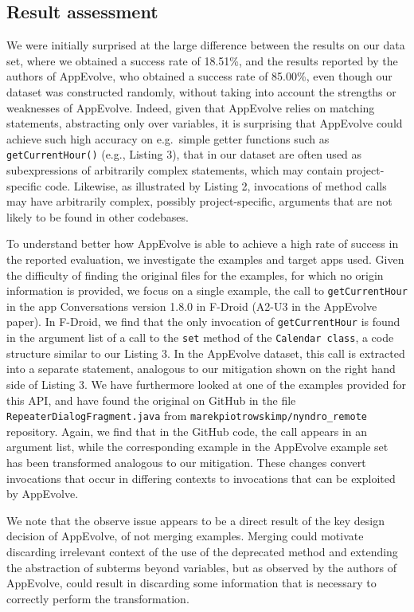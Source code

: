 \subsection{Result assessment}

We were initially surprised at the large difference between the results on
our data set, where we obtained a success rate of
18.51\%, and the results reported by the authors of AppEvolve, who
obtained a success rate of 85.00\%, even though our dataset was
constructed randomly, without taking into account the strengths or
weaknesses of AppEvolve.  Indeed, given that AppEvolve relies on matching
statements, abstracting only over variables, it is surprising that
AppEvolve could achieve such high accuracy on e.g.\ simple getter functions such
as {\tt getCurrentHour()} (e.g., Listing 3), that in our dataset are often
used as subexpressions of arbitrarily complex statements, which may contain
project-specific code.  Likewise, as illustrated by Listing 2, invocations
of method calls may have arbitrarily complex, possibly project-specific,
arguments that are not likely to be found in other codebases.

To understand better how AppEvolve is able to achieve a high rate of
success in the reported evaluation, we investigate the examples and target
apps used.  Given the difficulty of finding the original files for the
examples, for which no origin information is provided, we focus on a single
example, the call to {\tt getCurrentHour} in the app {\sc Conversations}
version 1.8.0 in F-Droid (A2-U3 in the AppEvolve paper).  In F-Droid, we
find that the only invocation of {\tt getCurrentHour} is found in the
argument list of a call to the {\tt set} method of the {\tt Calendar
  class}, a code structure similar to our Listing 3.  In the AppEvolve
dataset, this call is extracted into a separate statement, analogous to our
mitigation shown on the right hand side of Listing 3.  We have furthermore
looked at one of the examples provided for this API, and have found the
original on GitHub in the file {\tt RepeaterDialogFragment.java} from {\tt marekpiotrowskimp/nyndro\_remote} repository.  Again, we find that in the
GitHub code, the call appears in an argument list, while the corresponding
example in the AppEvolve example set has been transformed analogous to our
mitigation.  These changes convert invocations that occur in differing
contexts to invocations that can be exploited by AppEvolve.

We note that the observe issue appears to be a direct result of the key
design decision of AppEvolve, of not merging examples.  Merging could
motivate discarding irrelevant context of the use of the deprecated method
and extending the abstraction of subterms beyond variables, but as observed
by the authors of AppEvolve, could result in discarding some information
that is necessary to correctly perform the transformation.

